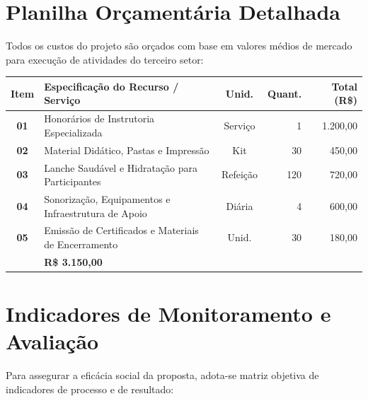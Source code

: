 \documentclass[12pt,a4paper]{article}
\begin{document}
\vspace{0.3cm}

\section{Planilha Orçamentária Detalhada}

Todos os custos do projeto são orçados com base em valores médios de mercado para execução de atividades do terceiro setor:

\begin{table}[h!]
\centering
\small
\renewcommand{\arraystretch}{1.2}
\begin{tabularx}{\textwidth}{@{}>{\bfseries}c X c r r@{}}
\toprule
Item & Especificação do Recurso / Serviço & Unid. & Quant. & Total (R\$) \\
\midrule
01 & Honorários de Instrutoria Especializada & Serviço & 1 & 1.200,00 \\
02 & Material Didático, Pastas e Impressão & Kit & 30 & 450,00 \\
03 & Lanche Saudável e Hidratação para Participantes & Refeição & 120 & 720,00 \\
04 & Sonorização, Equipamentos e Infraestrutura de Apoio & Diária & 4 & 600,00 \\
05 & Emissão de Certificados e Materiais de Encerramento & Unid. & 30 & 180,00 \\
\midrule
\multicolumn{4}{@{}r}{\textbf{VALOR TOTAL DO PROJETO:}} & \textbf{R\$ 3.150,00} \\
\bottomrule
\end{tabularx}
\end{table}

\vspace{0.3cm}

\section{Indicadores de Monitoramento e Avaliação}

Para assegurar a eficácia social da proposta, adota-se matriz objetiva de indicadores de processo e de resultado:
\end{document}
